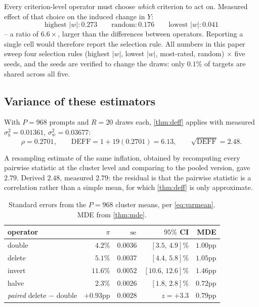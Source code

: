 Every criterion-level operator must choose \emph{which} criterion to act on.
Measured effect of that choice on the induced change in $Y$:
\[
\text{highest }|w|: 0.273 \qquad \text{random}: 0.176 \qquad \text{lowest }|w|: 0.041
\]
-- a ratio of $6.6\times$, larger than the differences between operators. Reporting a
single cell would therefore report the selection rule. All numbers in this paper
sweep four selection rules (highest $|w|$, lowest $|w|$, most-rated, random)
$\times$ five seeds, and the seeds are verified to change the draws: only $0.1\%$
of targets are shared across all five.

\subsection{Variance of these estimators}

With $P=968$ prompts and $R=20$ draws each, \cref{thm:deff} applies with measured
$\sigma_b^2 = 0.01361$, $\sigma_w^2 = 0.03677$:
\[
\rho = 0.2701, \qquad \mathrm{DEFF} = 1+19(0.2701) = 6.13, \qquad \sqrt{\mathrm{DEFF}} = 2.48 .
\]

\begin{remark}
A resampling estimate of the same inflation, obtained by recomputing every
pairwise statistic at the cluster level and comparing to the pooled version,
gave $2.79$. Derived $2.48$, measured $2.79$: the residual is that the pairwise
statistic is a correlation rather than a simple mean, for which \cref{thm:deff}
is only approximate.
\end{remark}

\begin{table}[H]\centering\small
\begin{tabular}{lrrrr}
\toprule
operator & $\pi$ & $\operatorname{se}$ & $95\%$ CI & MDE\\
\midrule
double & $4.2\%$ & $0.0036$ & $[3.5,\,4.9]\%$ & $1.00$pp\\
delete & $5.1\%$ & $0.0037$ & $[4.4,\,5.8]\%$ & $1.05$pp\\
invert & $11.6\%$ & $0.0052$ & $[10.6,\,12.6]\%$ & $1.46$pp\\
halve & $2.3\%$ & $0.0026$ & $[1.8,\,2.8]\%$ & $0.72$pp\\
\midrule
\emph{paired} delete $-$ double & $+0.93$pp & $0.0028$ & $z=+3.3$ & $0.79$pp\\
\bottomrule
\end{tabular}
\caption{Standard errors from the $P=968$ cluster means, per \cref{eq:varmean}.
MDE from \cref{thm:mde}.}
\label{tab:power}
\end{table}


